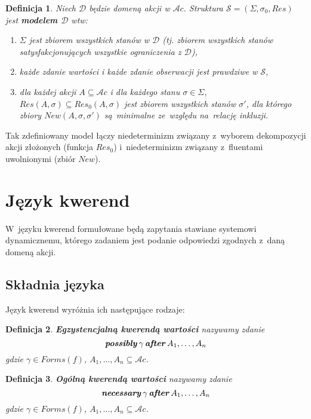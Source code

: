 \documentclass[11pt,a4paper]{article}
\newtheorem{defn}{Definicja}
\DeclareMathOperator{\After}{\textbf{\textit{after}}}
\DeclareMathOperator{\Possibly}{\textbf{\textit{possibly}}}
\DeclareMathOperator{\Necessary}{\textbf{\textit{necessary}}}
\begin{document}
\begin{defn}
    Niech $\mathcal{D}$ będzie domeną akcji w $\mathcal{A}c$. Struktura $\mathcal{S} = (\Sigma,\sigma_0,Res)$ jest \textbf{modelem $\mathcal{D}$} wtw:
    \begin{enumerate}
    \item $\Sigma$ jest zbiorem wszystkich stanów w $\mathcal{D}$ (tj. zbiorem wszystkich stanów satysfakcjonujących wszystkie ograniczenia z $\mathcal{D}$),
    \item każde zdanie wartości i każde zdanie obserwacji jest prawdziwe w $\mathcal{S}$,
    \item dla każdej akcji $A \subseteq \mathcal{A}c$ i dla każdego stanu $\sigma \in \Sigma$, $Res(A,\sigma) \subseteq Res_0(A,\sigma)$ jest zbiorem wszystkich stanów $\sigma'$, dla którego zbiory $New(A,\sigma,\sigma')$ są~minimalne ze~względu na~relację inkluzji.
    \end{enumerate}
\end{defn}

Tak zdefiniowany model łączy niedeterminizm związany z~wyborem dekompozycji akcji złożonych (funkcja $Res_0$) i~niedeterminizm związany z~fluentami uwolnionymi (zbiór $New$).

\section{Język kwerend}

W~języku kwerend formułowane będą zapytania stawiane systemowi dynamicznemu, którego zadaniem jest podanie odpowiedzi zgodnych z~daną domeną akcji.

\subsection{Składnia języka}
    Język kwerend wyróżnia ich następujące rodzaje:

    \begin{defn}
        \textbf{Egzystencjalną kwerendą wartości} nazywamy zdanie
        $$ \Possibly \gamma \After A_1, \dots, A_n $$
        gdzie $\gamma \in Forms(f)$, $A_1, \dots, A_n \subseteq \mathcal{A}c$.
    \end{defn}

    \begin{defn}
        \textbf{Ogólną kwerendą wartości} nazywamy zdanie
        $$ \Necessary \gamma \After A_1, \dots, A_n $$
        gdzie $\gamma \in Forms(f)$, $A_1, \dots, A_n \subseteq \mathcal{A}c$.
    \end{defn}
\end{document}
